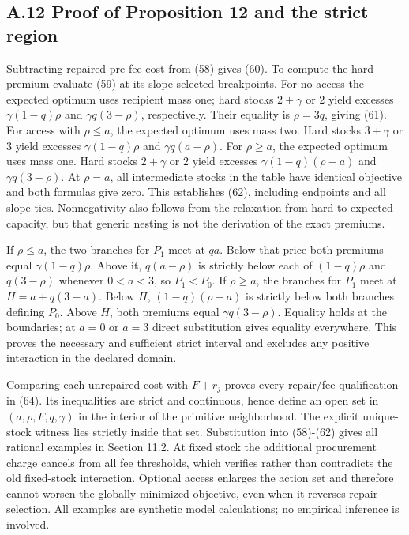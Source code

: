 \documentclass[
  11pt,
  a4paper,
]{article}
\begin{document}
\hypertarget{a.12-proof-of-proposition-12-and-the-strict-region}{%
\subsection{A.12 Proof of Proposition 12 and the strict
region}\label{a.12-proof-of-proposition-12-and-the-strict-region}}

Subtracting repaired pre-fee cost from (58) gives (60). To compute the
hard premium evaluate (59) at its slope-selected breakpoints. For no
access the expected optimum uses recipient mass one; hard stocks
\(2+\gamma\) or \(2\) yield excesses \(\gamma(1-q)\rho\) and
\(\gamma q(3-\rho)\), respectively. Their equality is \(\rho=3q\),
giving (61). For access with \(\rho\leq a\), the expected optimum uses
mass two. Hard stocks \(3+\gamma\) or \(3\) yield excesses
\(\gamma(1-q)\rho\) and \(\gamma q(a-\rho)\). For \(\rho\geq a\), the
expected optimum uses mass one. Hard stocks \(2+\gamma\) or \(2\) yield
excesses \(\gamma(1-q)(\rho-a)\) and \(\gamma q(3-\rho)\). At
\(\rho=a\), all intermediate stocks in the table have identical
objective and both formulas give zero. This establishes (62), including
endpoints and all slope ties. Nonnegativity also follows from the
relaxation from hard to expected capacity, but that generic nesting is
not the derivation of the exact premiums.

If \(\rho\leq a\), the two branches for \(P_1\) meet at \(qa\). Below
that price both premiums equal \(\gamma(1-q)\rho\). Above it,
\(q(a-\rho)\) is strictly below each of \((1-q)\rho\) and \(q(3-\rho)\)
whenever \(0<a<3\), so \(P_1<P_0\). If \(\rho\geq a\), the branches for
\(P_1\) meet at \(H=a+q(3-a)\). Below \(H\), \((1-q)(\rho-a)\) is
strictly below both branches defining \(P_0\). Above \(H\), both
premiums equal \(\gamma q(3-\rho)\). Equality holds at the boundaries;
at \(a=0\) or \(a=3\) direct substitution gives equality everywhere.
This proves the necessary and sufficient strict interval and excludes
any positive interaction in the declared domain.

Comparing each unrepaired cost with \(F+r_j\) proves every repair/fee
qualification in (64). Its inequalities are strict and continuous, hence
define an open set in \((a,\rho,F,q,\gamma)\) in the interior of the
primitive neighborhood. The explicit unique-stock witness lies strictly
inside that set. Substitution into (58)-(62) gives all rational examples
in Section 11.2. At fixed stock the additional procurement charge
cancels from all fee thresholds, which verifies rather than contradicts
the old fixed-stock interaction. Optional access enlarges the action set
and therefore cannot worsen the globally minimized objective, even when
it reverses repair selection. All examples are synthetic model
calculations; no empirical inference is involved.
\end{document}

